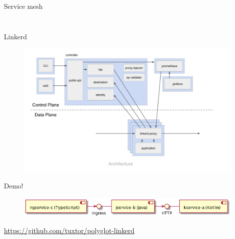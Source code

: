 \documentclass[aspectratio=169]{beamer}
\begin{document}
\begin{frame}{Service mesh}
\begin{columns}[T]
\begin{column}[T]{5cm}
\begin{figure}
    	\end{figure}
\end{column}
\end{columns}


\end{frame}


\begin{frame}{Linkerd}

	\begin{figure}
		\centering
		\includegraphics[width=0.9\linewidth]{Images/linkerd.png}
	\end{figure}


\end{frame}


\begin{frame}{Demo!}

	\begin{figure}
		\centering
		\includegraphics[width=0.9\linewidth]{Images/k8sdemo.png}
	\end{figure}

\url{https://github.com/tuxtor/polyglot-linkerd}

\end{frame}
\end{document}

